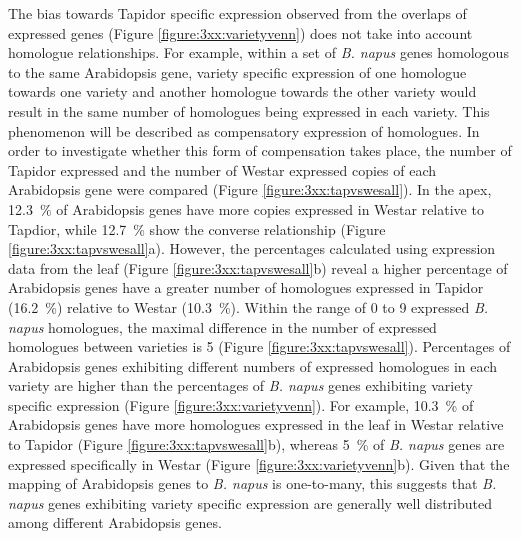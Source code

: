 \documentclass[12pt,]{book}
\begin{document}
The bias towards Tapidor specific expression observed from the overlaps
of expressed genes (Figure \ref{figure:3xx:varietyvenn}) does not take
into account homologue relationships. For example, within a set of
\emph{B. napus} genes homologous to the same Arabidopsis gene, variety
specific expression of one homologue towards one variety and another
homologue towards the other variety would result in the same number of
homologues being expressed in each variety. This phenomenon will be
described as compensatory expression of homologues. In order to
investigate whether this form of compensation takes place, the number of
Tapidor expressed and the number of Westar expressed copies of each
Arabidopsis gene were compared (Figure \ref{figure:3xx:tapvswesall}). In
the apex, 12.3~\% of Arabidopsis genes have more copies expressed in
Westar relative to Tapdior, while 12.7~\% show the converse relationship
(Figure \ref{figure:3xx:tapvswesall}a). However, the percentages
calculated using expression data from the leaf (Figure
\ref{figure:3xx:tapvswesall}b) reveal a higher percentage of Arabidopsis
genes have a greater number of homologues expressed in Tapidor (16.2~\%)
relative to Westar (10.3~\%). Within the range of 0 to 9 expressed
\emph{B. napus} homologues, the maximal difference in the number of
expressed homologues between varieties is 5 (Figure
\ref{figure:3xx:tapvswesall}). Percentages of Arabidopsis genes
exhibiting different numbers of expressed homologues in each variety are
higher than the percentages of \emph{B. napus} genes exhibiting variety
specific expression (Figure \ref{figure:3xx:varietyvenn}). For example,
10.3~\% of Arabidopsis genes have more homologues expressed in the leaf
in Westar relative to Tapidor (Figure \ref{figure:3xx:tapvswesall}b),
whereas 5~\% of \emph{B. napus} genes are expressed specifically in
Westar (Figure \ref{figure:3xx:varietyvenn}b). Given that the mapping of
Arabidopsis genes to \emph{B. napus} is one-to-many, this suggests that
\emph{B. napus} genes exhibiting variety specific expression are
generally well distributed among different Arabidopsis genes.
\end{document}
